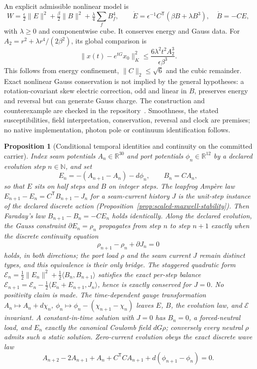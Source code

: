 \documentclass[11pt]{article}
\newtheorem{proposition}[theorem]{Proposition}
\theoremstyle{remark}
\theoremstyle{plain}
\begin{document}
An explicit admissible nonlinear model is
\[
 W=\tfrac\epsilon2\|E\|^2+\tfrac\beta2\|B\|^2
       +\tfrac\lambda4\sum_f B_f^4,\qquad
 \dot E=\epsilon^{-1}C^{\mathsf T}(\beta B+\lambda B^3),\quad
 \dot B=-CE,
\]
with $\lambda\ge0$ and componentwise cube. It conserves energy and Gauss
data. For $A_2=r^2+\lambda r^4/(2\beta^2)$, its global comparison is
\[
 \|x(t)-e^{tG}x_0\|_K^2
 \le\frac{6\lambda^2t^2 A_2^3}{\epsilon\beta^3}.
\]
This follows from energy confinement, $\|C\|_2\le\sqrt6$ and the cubic
remainder. Exact nonlinear Gauss conservation is not implied by the
general hypotheses: a rotation-covariant skew electric correction, odd
and linear in $B$, preserves energy and reversal but can generate Gauss
charge. The construction and counterexample are checked in the
repository~\cite{ophrepo}. Smoothness, the stated susceptibilities,
field interpretation, conservation, reversal and clock are premises; no
native implementation, photon pole or continuum identification follows.

\begin{proposition}[Conditional temporal identities and continuity on the committed carrier]
\label{prop:temporal-maxwell-evolution}
Index seam potentials \(A_n\in\mathbb R^{30}\) and port potentials
\(\phi_n\in\mathbb R^{12}\) by a declared evolution step \(n\in\mathbb N\),
and set
\[
E_n=-(A_{n+1}-A_n)-d\phi_n,\qquad B_n=CA_n,
\]
so that \(E\) sits on half steps and \(B\) on integer steps. The
leapfrog Amp\`ere law
\(E_{n+1}-E_n=C^{\mathsf T}B_{n+1}-J_n\) for a seam-current history \(J\) is
the unit-step instance of the declared discrete action
(Proposition~\ref{prop:scaled-maxwell-stability}).
Then Faraday's law \(B_{n+1}-B_n=-CE_n\) holds identically. Along the
declared evolution, the Gauss constraint \(\partial E_n=\rho_n\) propagates
from step \(n\) to step \(n+1\) exactly when the discrete continuity
equation
\[
\rho_{n+1}-\rho_n+\partial J_n=0
\]
holds, in both directions; the port load \(\rho\) and the seam current
\(J\) remain distinct types, and this equivalence is their only bridge.
The staggered quadratic form
\(\mathcal E_n=\tfrac12\lVert E_n\rVert^2+\tfrac12\langle B_n,B_{n+1}\rangle\)
satisfies the exact per-step balance
\(\mathcal E_{n+1}=\mathcal E_n-\tfrac12\langle E_n+E_{n+1},J_n\rangle\),
hence is exactly conserved for \(J=0\). No positivity claim is made. The time-dependent gauge
transformation \(A_n\mapsto A_n+d\chi_n\),
\(\phi_n\mapsto\phi_n-(\chi_{n+1}-\chi_n)\) leaves \(E\), \(B\), the
evolution law, and \(\mathcal E\) invariant. A constant-in-time solution
with \(J=0\) has \(B_n=0\), a forced-neutral load, and \(E_n\) exactly the
canonical Coulomb field \(dG\rho\); conversely every neutral \(\rho\) admits
such a static solution. Zero-current evolution obeys the exact discrete wave
law
\[
A_{n+2}-2A_{n+1}+A_n+C^{\mathsf T}CA_{n+1}+d(\phi_{n+1}-\phi_n)=0 .
\]
\end{proposition}
\end{document}
